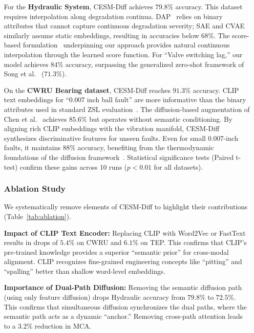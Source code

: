 For the \textbf{Hydraulic System}, CESM-Diff achieves $79.8\%$ accuracy. This dataset requires interpolation along degradation continua. DAP~\cite{lampert2009learning} relies on binary attributes that cannot capture continuous degradation severity; SAE and CVAE similarly assume static embeddings, resulting in accuracies below $68\%$. The score-based formulation~\cite{song2020score} underpinning our approach provides natural continuous interpolation through the learned score function. For ``Valve switching lag,'' our model achieves $84\%$ accuracy, surpassing the generalized zero-shot framework of Song et al.~\cite{song2025generalized} ($71.3\%$).

On the \textbf{CWRU Bearing dataset}, CESM-Diff reaches $91.3\%$ accuracy. CLIP text embeddings for ``0.007 inch ball fault'' are more informative than the binary attributes used in standard ZSL evaluation~\cite{xian2019zero}. The diffusion-based augmentation of Chen et al.~\cite{chen2024diffusion} achieves $85.6\%$ but operates without semantic conditioning. By aligning rich CLIP embeddings with the vibration manifold, CESM-Diff synthesizes discriminative features for unseen faults. Even for small 0.007-inch faults, it maintains $88\%$ accuracy, benefiting from the thermodynamic foundations of the diffusion framework~\cite{sohl2015deep}. Statistical significance tests (Paired t-test) confirm these gains across 10 runs ($p < 0.01$ for all datasets).

\subsubsection{Ablation Study}
We systematically remove elements of CESM-Diff to highlight their contributions (Table~\ref{tab:ablation}).

\textbf{Impact of CLIP Text Encoder:} Replacing CLIP with Word2Vec or FastText results in drops of $5.4\%$ on CWRU and $6.1\%$ on TEP. This confirms that CLIP's pre-trained knowledge provides a superior ``semantic prior'' for cross-modal alignment. CLIP recognizes fine-grained engineering concepts like ``pitting'' and ``spalling'' better than shallow word-level embeddings.

\textbf{Importance of Dual-Path Diffusion:} Removing the semantic diffusion path (using only feature diffusion) drops Hydraulic accuracy from $79.8\%$ to $72.5\%$. This confirms that simultaneous diffusion synchronizes the dual paths, where the semantic path acts as a dynamic ``anchor.'' Removing cross-path attention leads to a $3.2\%$ reduction in MCA.

